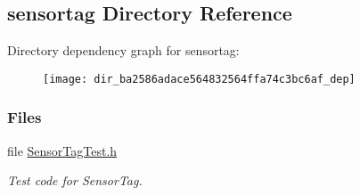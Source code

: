 \subsection{sensortag Directory Reference}
\label{dir_ba2586adace564832564ffa74c3bc6af}
Directory dependency graph for sensortag\+:
\nopagebreak
\begin{figure}[H]
\begin{center}
\leavevmode
\texttt{[image: dir\_ba2586adace564832564ffa74c3bc6af\_dep]}
\end{center}
\end{figure}
\subsubsection*{Files}
\begin{DoxyCompactItemize}
\item 
file \hyperlink{_sensor_tag_test_8h}{Sensor\+Tag\+Test.\+h}
\begin{DoxyCompactList}\small\item\em Test code for Sensor\+Tag. \end{DoxyCompactList}\end{DoxyCompactItemize}
